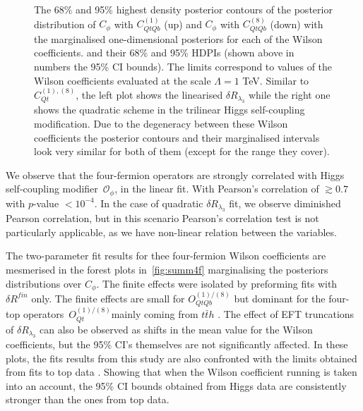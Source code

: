 \begin{figure}[h!]
\begin{center}
	\end{center}
	\caption{The 68\% and 95\% highest density posterior contours of the posterior distribution of $C_\phi$ with $C_{QtQb}^{(1)}$ (up) and $C_\phi$ with $C_{QtQb}^{(8)}$ (down) with the marginalised one-dimensional posteriors for each of the Wilson coefficients. and their 68\% and 95\% HDPIs (shown above in numbers the 95\% CI bounds). 
		The limits correspond to values of the Wilson coefficients evaluated at the scale $\Lambda=1$ TeV. 
		Similar to $C_{Qt}^{(1),(8)}$, the left plot shows the linearised  $\delta R_{\lambda_3}$ while the right one shows the quadratic scheme in the trilinear Higgs self-coupling modification. Due to the degeneracy between these Wilson coefficients the posterior contours and their marginalised intervals look very similar for both of them (except for the range they cover).  \label{2param-cqtqb} }
\end{figure}
We observe that the four-fermion operators are strongly correlated with Higgs self-coupling modifier~$\mathcal O_\phi$, in the linear fit. With Pearson's correlation of $ \gtrsim 0.7$ with $p$-value $< 10^{-4}$.  In the case of quadratic $\delta R_{\lambda_3}$ fit, we observe diminished Pearson correlation, but in this scenario Pearson's correlation test is not particularly applicable, as we have non-linear relation between the variables.
%
 \par The two-parameter fit results for thee four-fermion Wilson coefficients are mesmerised in the forest plots in~\autoref{fig:summ4f} marginalising the posteriors distributions over $C_\phi$. The finite effects were isolated by preforming fits with $\delta R^{fin}$ only. The finite effects are small for  $O_{QtQb}^{(1)/(8)}$ but dominant for the four-top operators~$O_{Qt}^{(1)/(8)}$mainly coming from $t\bar t h$ .    The effect of EFT truncations of $\delta R_{\lambda_3}$ can also be observed as shifts in the mean value for the Wilson coefficients, but the 95\% CI's themselves are not significantly affected.  In these plots, the fits results from this study are also confronted with the limits obtained from fits to top data \cite{Ethier:2021bye, Ellis:2020unq, Hartland:2019bjb,Brivio:2019ius,DHondt:2018cww, Zhang:2017mls}. Showing that when the Wilson coefficient running is taken into an account, the 95\% CI  bounds obtained from Higgs data are consistently stronger than the ones from top data.
